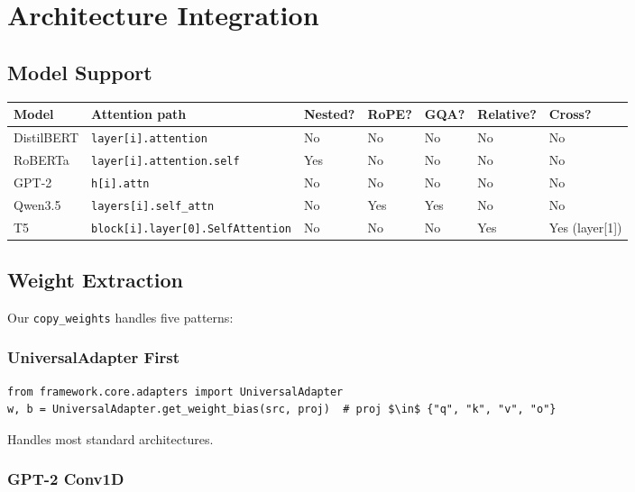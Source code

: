 \section{Architecture Integration}

\subsection{Model Support}

\begin{table}[H]
\centering
\small
\begin{tabular}{lllllll}
\toprule
\textbf{Model} & \textbf{Attention path} & \textbf{Nested?} & \textbf{RoPE?} & \textbf{GQA?} & \textbf{Relative?} & \textbf{Cross?} \\
\midrule
DistilBERT & \texttt{layer[i].attention} & No & No & No & No & No \\
RoBERTa & \texttt{layer[i].attention.self} & Yes & No & No & No & No \\
GPT-2 & \texttt{h[i].attn} & No & No & No & No & No \\
Qwen3.5 & \texttt{layers[i].self\_attn} & No & Yes & Yes & No & No \\
T5 & \texttt{block[i].layer[0].SelfAttention} & No & No & No & Yes & Yes (layer[1]) \\
\bottomrule
\end{tabular}
\end{table}

\subsection{Weight Extraction}

Our \texttt{copy\_weights} handles five patterns:

\subsubsection{UniversalAdapter First}

\begin{lstlisting}
from framework.core.adapters import UniversalAdapter
w, b = UniversalAdapter.get_weight_bias(src, proj)  # proj $\in$ {"q", "k", "v", "o"}
\end{lstlisting}

Handles most standard architectures.

\subsubsection{GPT-2 Conv1D}


